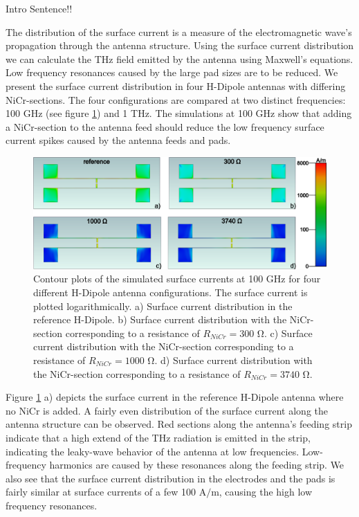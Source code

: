 Intro Sentence!!

The distribution of the surface current is a measure of the electromagnetic wave's propagation through the antenna structure. Using the surface current distribution we can calculate the THz field emitted by the antenna using Maxwell's equations. Low frequency resonances caused by the large pad sizes are to be reduced. We present the surface current distribution in four H-Dipole antennas with differing NiCr-sections. The four configurations are compared at two distinct frequencies: \num{100} \si{\giga \hertz} (see figure \ref{sc_100ghz_comp}) and \num{1} \si{\tera \hertz}. The simulations at \num{100} \si{\giga \hertz} show that adding a NiCr-section to the antenna feed should reduce the low frequency surface current spikes caused by the antenna feeds and pads.


\begin{figure}[ht]
    \centering
    \includegraphics[width=\linewidth]{figures/Contour_Plots_v2/100Ghz_SC_sim_plots.png}
    \caption{Contour plots of the simulated surface currents at \num{100} \si{\giga \hertz} for four different H-Dipole antenna configurations. The surface current is plotted logarithmically. a) Surface current distribution in the reference H-Dipole. b) Surface current distribution with the NiCr-section corresponding to a resistance of $R_{NiCr} = 300$ \si{\ohm}. c) Surface current distribution with the NiCr-section corresponding to a resistance of $R_{NiCr} = 1000$ \si{\ohm}. d) Surface current distribution with the NiCr-section corresponding to a resistance of $R_{NiCr} = 3740$ \si{\ohm}.}
    \label{sc_100ghz_comp}
\end{figure}

Figure \ref{sc_100ghz_comp} a) depicts the surface current in the reference H-Dipole antenna where no NiCr is added. A fairly even distribution of the surface current along the antenna structure can be observed. Red sections along the antenna's feeding strip indicate that a high extend of the THz radiation is emitted in the strip, indicating the leaky-wave behavior of the antenna at low frequencies. Low-frequency harmonics are caused by these resonances along the feeding strip. We also see that the surface current distribution in the electrodes and the pads is fairly similar at surface currents of a few 100 A$/$m, causing the high low frequency resonances. 

